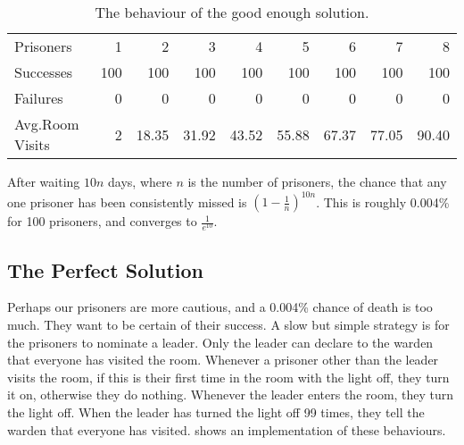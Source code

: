 \begin{table}
  \centering
  \begin{tabular}{l|rrrrrrrr} \toprule
    Prisoners          &   1 &   2    &   3    &   4    &   5    &   6    &   7    &   8 \\
    Successes          & 100 & 100    & 100    & 100    & 100    & 100    & 100    & 100 \\
    Failures           &   0 &   0    &   0    &   0    &   0    &   0    &   0    &   0 \\
    Avg.\@ Room Visits &   2 &  18.35 &  31.92 &  43.52 &  55.88 &  67.37 &  77.05 &  90.40 \\ \bottomrule
  \end{tabular}
  \caption{The behaviour of the good enough solution.}\label{tbl:100rand}
\end{table}

After waiting $10 n$ days, where $n$ is the number of prisoners, the
chance that any one prisoner has been consistently missed is
$\left(1 - \frac{1}{n}\right)^{10n}$.  This is roughly 0.004\% for 100
prisoners, and converges to $\frac{1}{e^{10}}$.

\subsection{The Perfect Solution}

Perhaps our prisoners are more cautious, and a 0.004\% chance of death
is too much.  They want to be certain of their success.  A slow but
simple strategy is for the prisoners to nominate a leader.  Only the
leader can declare to the warden that everyone has visited the room.
Whenever a prisoner other than the leader visits the room, if this is
their first time in the room with the light off, they turn it on,
otherwise they do nothing.  Whenever the leader enters the room, they
turn the light off.  When the leader has turned the light off 99
times, they tell the warden that everyone has visited.
 shows an implementation of these behaviours.


